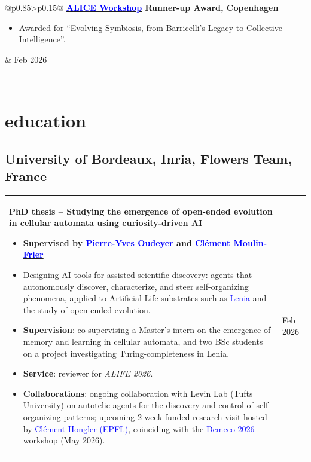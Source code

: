 \documentclass[a4paper]{article}
\makeatletter
\newlength{\tablewidth}
\newenvironment{period}[2]{%
\newcommand{\sarma}{#2}%
\setlength{\tablewidth}{\linewidth}
\addtolength{\tablewidth}{-2\tabcolsep}
\begin{tabular}{@{}p{0.85\tablewidth}>{\raggedleft\arraybackslash}p{0.15\tablewidth}@{}}%
#1 \newline
\begin{itemize}
}{%
\end{itemize} & \sarma \\%
\end{tabular}\\
}
\makeatother
\begin{document}
\begin{period}{\textbf{\href{https://aliceworkshop.org/}{\textcolor{blue}{ALICE Workshop}} Runner-up Award, Copenhagen}}{Feb 2026}
    \item Awarded for ``Evolving Symbiosis, from Barricelli's Legacy to Collective Intelligence''.
\end{period}


\section{education}

\subsection{\textbf{University of Bordeaux, Inria, Flowers Team, France}}
\begin{period}{\textbf{PhD thesis -- Studying the emergence of open-ended evolution in cellular automata using curiosity-driven AI}}{Oct 2024 -- current}
    \item  \textbf{Supervised by \href{http://www.pyoudeyer.com/}{\textcolor{blue}{Pierre-Yves Oudeyer}} and \href{https://clement-moulin-frier.github.io/}{\textcolor{blue}{Cl\'{e}ment Moulin-Frier}}}
    \item Designing AI tools for assisted scientific discovery: agents that autonomously discover, characterize, and steer self-organizing phenomena, applied to Artificial Life substrates such as \href{https://www.youtube.com/watch?v=HT49wpyux-k}{\textcolor{blue}{Lenia}} and the study of open-ended evolution.
    \item \textbf{Supervision}: co-supervising a Master's intern on the emergence of memory and learning in cellular automata, and two BSc students on a project investigating Turing-completeness in Lenia.
    \item \textbf{Service}: reviewer for \textit{ALIFE 2026}.
    \item \textbf{Collaborations}: ongoing collaboration with Levin Lab (Tufts University) on autotelic agents for the discovery and control of self-organizing patterns; upcoming 2-week funded research visit hosted by \href{https://www.epfl.ch/labs/csft/}{\textcolor{blue}{Cl\'{e}ment Hongler (EPFL)}}, coinciding with the \href{https://www.dem.eco/}{\textcolor{blue}{Demeco 2026}} workshop (May 2026).
\end{period}
\end{document}

